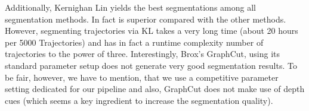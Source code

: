 Additionally, Kernighan Lin yields the best segmentations among all segmentation methods. In fact is superior compared with the other methods. However, segmenting trajectories via KL takes a very long time (about 20 hours per 5000 Trajectories) and has in fact a runtime complexity number of trajectories to the power of three. Interestingly, Brox's GraphCut, using its standard parameter setup does not generate very good segmentation results. To be fair, however, we have to mention, that we use a competitive parameter setting dedicated for our pipeline and also, GraphCut does not make use of depth cues (which seems a key ingredient to increase the segmentation quality).


